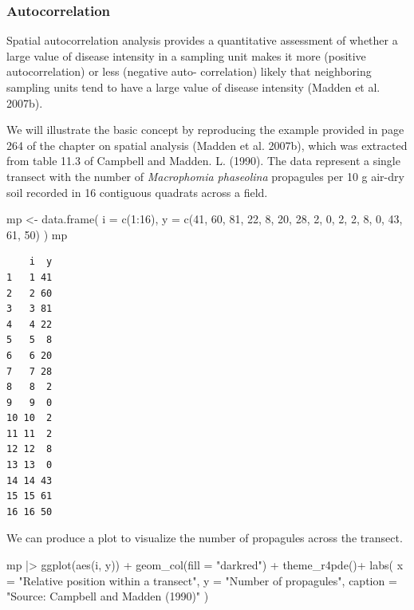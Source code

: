 \documentclass[
  letterpaper,
]{book}
\newenvironment{Shaded}{\begin{snugshade}}{\end{snugshade}}
\newcommand{\AttributeTok}[1]{\textcolor[rgb]{0.40,0.45,0.13}{#1}}
\newcommand{\DecValTok}[1]{\textcolor[rgb]{0.68,0.00,0.00}{#1}}
\newcommand{\FunctionTok}[1]{\textcolor[rgb]{0.28,0.35,0.67}{#1}}
\newcommand{\NormalTok}[1]{\textcolor[rgb]{0.00,0.23,0.31}{#1}}
\newcommand{\OtherTok}[1]{\textcolor[rgb]{0.00,0.23,0.31}{#1}}
\newcommand{\SpecialCharTok}[1]{\textcolor[rgb]{0.37,0.37,0.37}{#1}}
\newcommand{\StringTok}[1]{\textcolor[rgb]{0.13,0.47,0.30}{#1}}
\begin{document}
\hypertarget{autocorrelation}{%
\subsubsection{Autocorrelation}\label{autocorrelation}}

Spatial autocorrelation analysis provides a quantitative assessment of
whether a large value of disease intensity in a sampling unit makes it
more (positive autocorrelation) or less (negative auto- correlation)
likely that neighboring sampling units tend to have a large value of
disease intensity (Madden et al. 2007b).

We will illustrate the basic concept by reproducing the example provided
in page 264 of the chapter on spatial analysis (Madden et al. 2007b),
which was extracted from table 11.3 of Campbell and Madden. L. (1990).
The data represent a single transect with the number of
\emph{Macrophomia phaseolina} propagules per 10 g air-dry soil recorded
in 16 contiguous quadrats across a field.

\begin{Shaded}
\begin{Highlighting}[]
\NormalTok{mp }\OtherTok{\textless{}{-}} \FunctionTok{data.frame}\NormalTok{(}
  \AttributeTok{i =} \FunctionTok{c}\NormalTok{(}\DecValTok{1}\SpecialCharTok{:}\DecValTok{16}\NormalTok{),}
  \AttributeTok{y =} \FunctionTok{c}\NormalTok{(}\DecValTok{41}\NormalTok{, }\DecValTok{60}\NormalTok{, }\DecValTok{81}\NormalTok{, }\DecValTok{22}\NormalTok{, }\DecValTok{8}\NormalTok{, }\DecValTok{20}\NormalTok{, }\DecValTok{28}\NormalTok{, }\DecValTok{2}\NormalTok{, }\DecValTok{0}\NormalTok{, }\DecValTok{2}\NormalTok{, }\DecValTok{2}\NormalTok{, }\DecValTok{8}\NormalTok{, }\DecValTok{0}\NormalTok{, }\DecValTok{43}\NormalTok{, }\DecValTok{61}\NormalTok{, }\DecValTok{50}\NormalTok{)}
\NormalTok{)}
\NormalTok{mp}
\end{Highlighting}
\end{Shaded}

\begin{verbatim}
    i  y
1   1 41
2   2 60
3   3 81
4   4 22
5   5  8
6   6 20
7   7 28
8   8  2
9   9  0
10 10  2
11 11  2
12 12  8
13 13  0
14 14 43
15 15 61
16 16 50
\end{verbatim}

We can produce a plot to visualize the number of propagules across the
transect.

\begin{Shaded}
\begin{Highlighting}[]
\NormalTok{mp }\SpecialCharTok{|\textgreater{}}
  \FunctionTok{ggplot}\NormalTok{(}\FunctionTok{aes}\NormalTok{(i, y)) }\SpecialCharTok{+}
  \FunctionTok{geom\_col}\NormalTok{(}\AttributeTok{fill =} \StringTok{"darkred"}\NormalTok{) }\SpecialCharTok{+}
  \FunctionTok{theme\_r4pde}\NormalTok{()}\SpecialCharTok{+}
  \FunctionTok{labs}\NormalTok{(}
    \AttributeTok{x =} \StringTok{"Relative position within a transect"}\NormalTok{,}
    \AttributeTok{y =} \StringTok{"Number of propagules"}\NormalTok{,}
    \AttributeTok{caption =} \StringTok{"Source: Campbell and Madden (1990)"}
\NormalTok{  )}
\end{Highlighting}
\end{Shaded}
\end{document}
